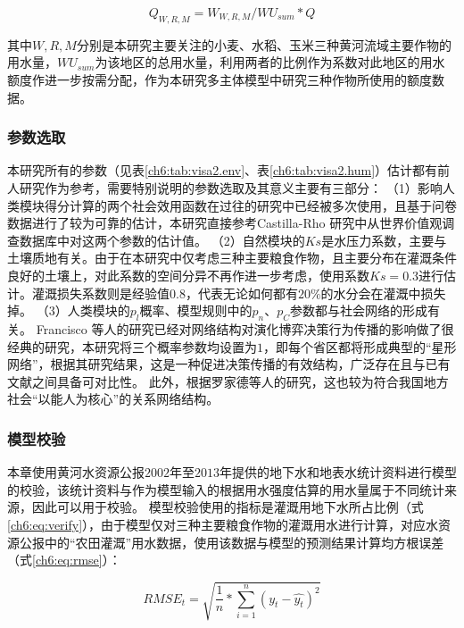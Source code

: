 \begin{equation}
    Q_{W, R, M} = W_{W, R, M} / WU_{sum} * Q
\end{equation}

其中$W, R, M$分别是本研究主要关注的小麦、水稻、玉米三种黄河流域主要作物的用水量，$WU_{sum}$为该地区的总用水量，利用两者的比例作为系数对此地区的用水额度作进一步按需分配，作为本研究多主体模型中研究三种作物所使用的额度数据。



\subsubsection{参数选取}

本研究所有的参数（见表\ref{ch6:tab:visa2.env}、表\ref{ch6:tab:visa2.hum}）估计都有前人研究作为参考，需要特别说明的参数选取及其意义主要有三部分：
（1）影响人类模块得分计算的两个社会效用函数在过往的研究中已经被多次使用，且基于问卷数据进行了较为可靠的估计，本研究直接参考Castilla-Rho 研究中从世界价值观调查数据库中对这两个参数的估计值\cite{castilla-rho2015, castilla-rho2017, castilla-rho2020}。
（2）自然模块的$Ks$是水压力系数，主要与土壤质地有关。由于在本研究中仅考虑三种主要粮食作物，且主要分布在灌溉条件良好的土壤上，对此系数的空间分异不再作进一步考虑，使用系数$Ks = 0.3$进行估计。灌溉损失系数则是经验值$0.8$，代表无论如何都有$20\%$的水分会在灌溉中损失掉。
（3）人类模块的$p_l$概率、模型规则中的$p_n$、$p_C$参数都与社会网络的形成有关。
Francisco 等人的研究已经对网络结构对演化博弈决策行为传播的影响做了很经典的研究\cite{santos2008}，本研究将三个概率参数均设置为$1$，即每个省区都将形成典型的“星形网络”，根据其研究结果，这是一种促进决策传播的有效结构，广泛存在且与已有文献之间具备可对比性\cite{santos2008}。
此外，根据罗家德等人的研究，这也较为符合我国地方社会“以能人为核心”的关系网络结构\cite{luojiade2013}。

\subsubsection{模型校验}

本章使用黄河水资源公报$2002$年至$2013$年提供的地下水和地表水统计资料进行模型的校验，该统计资料与作为模型输入的根据用水强度估算的用水量属于不同统计来源，因此可以用于校验。
模型校验使用的指标是灌溉用地下水所占比例（式\ref{ch6:eq:verify}），由于模型仅对三种主要粮食作物的灌溉用水进行计算，对应水资源公报中的“农田灌溉”用水数据，使用该数据与模型的预测结果计算均方根误差（式\ref{ch6:eq:rmse}）：

\begin{equation}
    \label{ch6:eq:rmse}
    RMSE_t = \sqrt{\frac{1}{n}*\sum_{i=1}^{n}{(y_t - \hat{y_t})}^2}
\end{equation}

